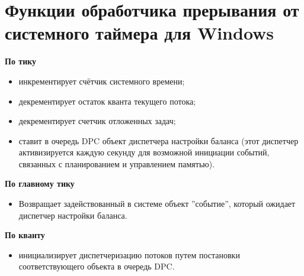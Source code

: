 \documentclass[a4paper,oneside,14pt]{extreport}
\begin{document}


\section*{Функции обработчика прерывания от системного таймера для Windows}
\noindent
\textbf{По тику}
\begin{itemize}
	\item инкрементирует счётчик системного времени;
	\item декрементирует остаток кванта текущего потока;
	\item декрементирует счетчик отложенных задач;
	\item ставит в очередь DPC объект диспетчера настройки баланса
	(этот диспетчер активизируется каждую секунду для возможной инициации событий,
	связанных с планированием и управлением памятью).
\end{itemize}
\textbf{По главному тику}
\begin{itemize}
	\item Возвращает задействованный в системе объект ''событие'', который ожидает диспетчер настройки баланса.
\end{itemize}
\textbf{По кванту}
\begin{itemize}
	\item инициализирует диспетчеризацию потоков путем постановки соответствующего объекта в очередь DPC.
\end{itemize}
\end{document}
